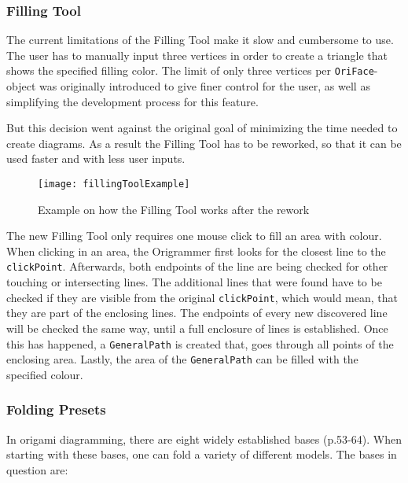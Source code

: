 \subsubsection{Filling Tool}

The current limitations of the Filling Tool make it slow and cumbersome to use. The user has to manually input three vertices in order to create a triangle that shows the specified filling color. The limit of only three vertices per \texttt{OriFace}-object was originally introduced to give finer control for the user, as well as simplifying the development process for this feature.

But this decision went against the original goal of minimizing the time needed to create diagrams. As a result the Filling Tool has to be reworked, so that it can be used faster and with less user inputs.

\begin{figure}[htbp]
	\centering
	\texttt{[image: fillingToolExample]}
	\caption{Example on how the Filling Tool works after the rework}
	\label{fig:fillingToolExample}
\end{figure}
The new Filling Tool only requires one mouse click to fill an area with colour. When clicking in an area, the Origrammer first looks for the closest line to the \texttt{clickPoint}. Afterwards, both endpoints of the line are being checked for other touching or intersecting lines. The additional lines that were found have to be checked if they are visible from the original \texttt{clickPoint}, which would mean, that they are part of the enclosing lines. The endpoints of every new discovered line will be checked the same way, until a full enclosure of lines is established. Once this has happened, a \texttt{GeneralPath} is created that, goes through all points of the enclosing area. Lastly, the area of the \texttt{GeneralPath} can be filled with the specified colour.




\newpage
\subsubsection{Folding Presets}
In origami diagramming, there are eight widely established bases\cite{DesignSecrets} (p.53-64). When starting with these bases, one can fold a variety of different models. The bases in question are:

 
